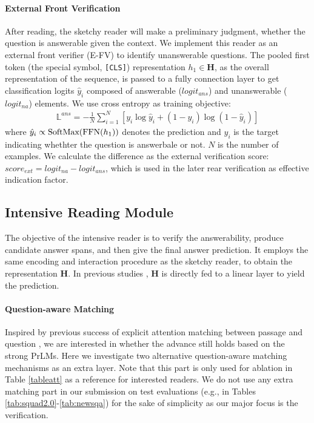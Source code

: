 \documentclass[letterpaper]{article} %
\begin{document}
\paragraph{External Front Verification}
After reading, the sketchy reader will make a preliminary judgment, whether the question is answerable given the context. We implement this reader as an external front verifier (E-FV) to identify unanswerable questions. The pooled first token (the special symbol, \texttt{[CLS]}) representation $h_1 \in \textbf{H}$, as the overall representation of the sequence, is passed to a fully connection layer to get classification logits $\hat{y}_{i}$ composed of answerable ($logit_{ans}$) and unanswerable ($logit_{na}$) elements. We use cross entropy as training objective:
\begin{align}
\mathbb{L}^{ans} = -\frac{1}{N}\sum_{i=1}^{N}\left [y_{i}\log\hat{y}_{i} + (1-y_{i})\log(1-\hat{y}_{i} )\right ]
\end{align}
where $\hat{y}_{i} \propto \textup{SoftMax}(\textup{FFN}(h_1))$ denotes the prediction and $y_{i}$ is the target indicating whethter the question is answerbale or not. $N$ is the number of examples. We calculate the difference as the external verification score: $score_{ext} = logit_{na} - logit_{ans}$, which is used in the later rear verification as effective indication factor.

\subsection{Intensive Reading Module}\label{sec:intensive}
The objective of the intensive reader is to verify the answerability, produce candidate answer spans, and then give the final answer prediction. It employs the same encoding and interaction procedure as the sketchy reader, to obtain the representation $\textbf{H}$. In previous studies \cite{devlin2018bert,yang2019xlnet,Lan2020ALBERT}, $\textbf{H}$ is directly fed to a linear layer to yield the prediction.


\paragraph{Question-aware Matching}
Inspired by previous success of explicit attention matching between passage and question \cite{kadlec2016text,Dhingra2017Gated,Wang2017Gated,Seo2016Bidirectional}, we are interested in whether the advance still holds based on the strong PrLMs. Here we investigate two alternative question-aware matching mechanisms as an extra layer. Note that this part is only used for ablation in Table \ref{tableatt} as a reference for interested readers. We do not use any extra matching part in our submission on test evaluations (e.g., in Tables \ref{tab:squad2.0}-\ref{tab:newsqa}) for the sake of simplicity as our major focus is the verification.
\end{document}
